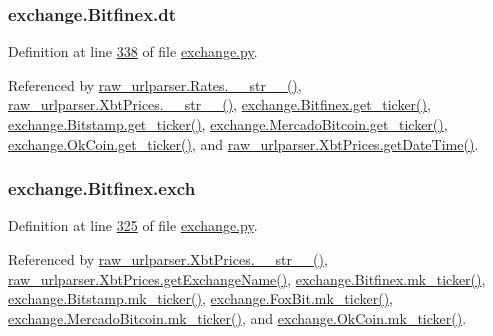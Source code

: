 \subsubsection[{\texorpdfstring{dt}{dt}}]{\setlength{\rightskip}{0pt plus 5cm}exchange.\+Bitfinex.\+dt}\hypertarget{classexchange_1_1_bitfinex_adc9e5a19056dcc22e8028e749b233795}{}\label{classexchange_1_1_bitfinex_adc9e5a19056dcc22e8028e749b233795}


Definition at line \hyperlink{exchange_8py_source_l00338}{338} of file \hyperlink{exchange_8py_source}{exchange.\+py}.



Referenced by \hyperlink{raw__urlparser_8py_source_l00038}{raw\+\_\+urlparser.\+Rates.\+\_\+\+\_\+str\+\_\+\+\_\+()}, \hyperlink{raw__urlparser_8py_source_l00074}{raw\+\_\+urlparser.\+Xbt\+Prices.\+\_\+\+\_\+str\+\_\+\+\_\+()}, \hyperlink{exchange_8py_source_l00340}{exchange.\+Bitfinex.\+get\+\_\+ticker()}, \hyperlink{exchange_8py_source_l00409}{exchange.\+Bitstamp.\+get\+\_\+ticker()}, \hyperlink{exchange_8py_source_l00543}{exchange.\+Mercado\+Bitcoin.\+get\+\_\+ticker()}, \hyperlink{exchange_8py_source_l00608}{exchange.\+Ok\+Coin.\+get\+\_\+ticker()}, and \hyperlink{raw__urlparser_8py_source_l00059}{raw\+\_\+urlparser.\+Xbt\+Prices.\+get\+Date\+Time()}.

\subsubsection[{\texorpdfstring{exch}{exch}}]{\setlength{\rightskip}{0pt plus 5cm}exchange.\+Bitfinex.\+exch}\hypertarget{classexchange_1_1_bitfinex_af5865e2fa72ee1706254ba963bfa10e9}{}\label{classexchange_1_1_bitfinex_af5865e2fa72ee1706254ba963bfa10e9}


Definition at line \hyperlink{exchange_8py_source_l00325}{325} of file \hyperlink{exchange_8py_source}{exchange.\+py}.



Referenced by \hyperlink{raw__urlparser_8py_source_l00074}{raw\+\_\+urlparser.\+Xbt\+Prices.\+\_\+\+\_\+str\+\_\+\+\_\+()}, \hyperlink{raw__urlparser_8py_source_l00068}{raw\+\_\+urlparser.\+Xbt\+Prices.\+get\+Exchange\+Name()}, \hyperlink{exchange_8py_source_l00354}{exchange.\+Bitfinex.\+mk\+\_\+ticker()}, \hyperlink{exchange_8py_source_l00423}{exchange.\+Bitstamp.\+mk\+\_\+ticker()}, \hyperlink{exchange_8py_source_l00482}{exchange.\+Fox\+Bit.\+mk\+\_\+ticker()}, \hyperlink{exchange_8py_source_l00557}{exchange.\+Mercado\+Bitcoin.\+mk\+\_\+ticker()}, and \hyperlink{exchange_8py_source_l00622}{exchange.\+Ok\+Coin.\+mk\+\_\+ticker()}.

